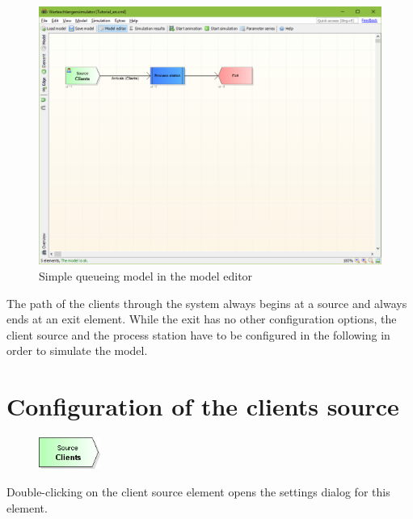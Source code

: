 \documentclass{svmono}
\begin{document}
\begin{figure}[H]	
	\caption{Simple queueing model in the model editor}
	\centerline{\includegraphics[width=14cm]{ProgramWindowModel.png}}
	\label{fig:ProgramWindowModel}
\end{figure}

The path of the clients through the system always begins at a source and always ends at an exit element. While the exit has no other configuration options, the client source and the process station have to be configured in the following in order to simulate the model.

\section{Configuration of the clients source}

\begin{figure}
\vspace{-22pt}
\includegraphics[width=2cm]{IconSource.png}
\vspace{-22pt}
\end{figure}
Double-clicking on the client source element opens the settings dialog for this element.
\end{document}
